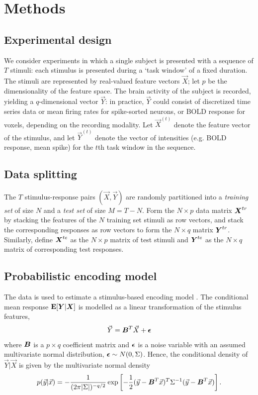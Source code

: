 \documentclass[12pt]{article}
\begin{document}
\section{Methods}

\subsection{Experimental design}

We consider experiments in which a single subject is presented with a
sequence of $T$ stimuli: each stimulus is presented during a `task
window' of a fixed duration.  The stimuli are represented by
real-valued feature vectors $\vec{X}$; let $p$ be the dimensionality of
the feature space.  The brain activity of the subject is recorded,
yielding a $q$-dimensional vector $\vec{Y}$: in practice, $\vec{Y}$ could
consist of discretized time series data or mean firing rates for
spike-sorted neurons, or BOLD response for voxels, depending on the
recording modality.  Let $\vec{X}^{(t)}$ denote the feature vector of the
stimulus, and let $\vec{Y}^{(t)}$ denote the vector of intensities
(e.g. BOLD response, mean spike) for the $t$th task window in the
sequence.

\subsection{Data splitting}

The $T$ stimulus-response pairs $(\vec{X}, \vec{Y})$ are randomly
partitioned into a \emph{training set} of size $N$ and a \emph{test
set} of size $M = T-N$.  Form the $N \times p$ data matrix $\boldsymbol{X}^{tr}$
by stacking the features of the $N$ training set stimuli as row
vectors, and stack the corresponding responses as row vectors to form
the $N \times q$ matrix $\boldsymbol{Y}^{tr}$.  Similarly, define $\boldsymbol{X}^{te}$ as
the $N \times p$ matrix of test stimuli and $\boldsymbol{Y}^{te}$ as the
$N \times q$ matrix of corresponding test responses.

\subsection{Probabilistic encoding model}

The data is used to estimate a stimulus-based encoding
model \cite{Kay2008a}\cite{Naselaris2011}\cite{Mitchell2008}.
The conditional mean response $\textbf{E}[\boldsymbol{Y}|\boldsymbol{X}]$ is modelled as
a linear transformation of the stimulus features,
\[
\vec{Y} = \boldsymbol{B}^T \vec{X} + \boldsymbol{\epsilon}
\]
where $\boldsymbol{B}$ is a $p \times q$ coefficient matrix and $\boldsymbol{\epsilon}$ is a
noise variable with an assumed multivariate normal distribution, $\boldsymbol{\epsilon} \sim N(0, \Sigma)$.  
Hence, the conditional density of $\vec{Y}|\vec{X}$ is given by the multivariate normal density
\[
p(\vec{y}|\vec{x}) = -\frac{1}{(2\pi |\Sigma|)^{-q/2}} \exp\left[-\frac{1}{2}(\vec{y} - \boldsymbol{B}^T \vec{x})^T \Sigma^{-1} (\vec{y}-\boldsymbol{B}^T \vec{x})\right].
\]
\end{document}
